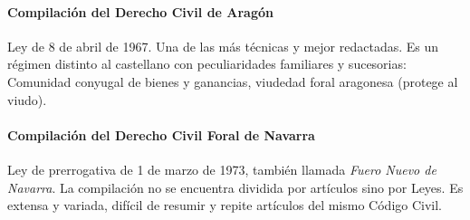 \documentclass[a4paper,12pt]{report}
\begin{document}
\paragraph{Compilación del Derecho Civil de Aragón}

Ley de 8 de abril de 1967. Una de las más técnicas y mejor redactadas. Es un
régimen distinto al castellano con peculiaridades familiares y sucesorias:
Comunidad conyugal de bienes y ganancias, viudedad foral aragonesa (protege al
viudo).

\paragraph{Compilación del Derecho Civil Foral de Navarra}

Ley de prerrogativa de 1 de marzo de 1973, también llamada \emph{Fuero Nuevo de
Navarra}. La compilación no se encuentra dividida por artículos sino por Leyes.
Es extensa y variada, difícil de resumir y repite artículos del mismo Código
Civil.
\end{document}
